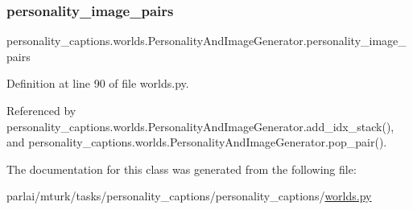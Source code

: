 \mbox{\label{classpersonality__captions_1_1worlds_1_1PersonalityAndImageGenerator_a28343ba1f0f6ee18157127f40bcac251}} 
\subsubsection{\texorpdfstring{personality\+\_\+image\+\_\+pairs}{personality\_image\_pairs}}
{\footnotesize\ttfamily personality\+\_\+captions.\+worlds.\+Personality\+And\+Image\+Generator.\+personality\+\_\+image\+\_\+pairs}



Definition at line 90 of file worlds.\+py.



Referenced by personality\+\_\+captions.\+worlds.\+Personality\+And\+Image\+Generator.\+add\+\_\+idx\+\_\+stack(), and personality\+\_\+captions.\+worlds.\+Personality\+And\+Image\+Generator.\+pop\+\_\+pair().



The documentation for this class was generated from the following file\+:\begin{DoxyCompactItemize}
\item 
parlai/mturk/tasks/personality\+\_\+captions/personality\+\_\+captions/\hyperlink{parlai_2mturk_2tasks_2personality__captions_2personality__captions_2worlds_8py}{worlds.\+py}\end{DoxyCompactItemize}
